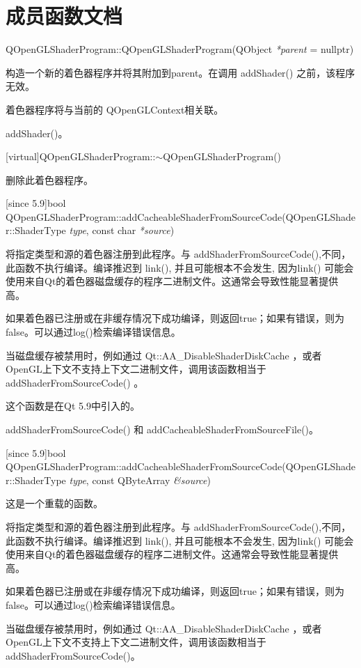 \section{成员函数文档}

QOpenGLShaderProgram::QOpenGLShaderProgram(QObject \emph{*parent} = nullptr)

构造一个新的着色器程序并将其附加到parent。在调用 addShader() 之前，该程序无效。

着色器程序将与当前的 QOpenGLContext相关联。

\begin{seeAlso}
addShader()。
\end{seeAlso}

[virtual]QOpenGLShaderProgram::$\sim$QOpenGLShaderProgram()

删除此着色器程序。

[since 5.9]bool QOpenGLShaderProgram::addCacheableShaderFromSourceCode(QOpenGLShader::ShaderType \emph{type}, const char \emph{*source})

将指定类型和源的着色器注册到此程序。与 addShaderFromSourceCode(),不同，此函数不执行编译。编译推迟到 link(), 并且可能根本不会发生, 因为link() 可能会使用来自Qt的着色器磁盘缓存的程序二进制文件。这通常会导致性能显著提供高。

如果着色器已注册或在非缓存情况下成功编译，则返回true；如果有错误，则为false。可以通过log()检索编译错误信息。

当磁盘缓存被禁用时，例如通过 Qt::AA\_DisableShaderDiskCache ，或者OpenGL上下文不支持上下文二进制文件，调用该函数相当于addShaderFromSourceCode() 。

这个函数是在Qt 5.9中引入的。

\begin{seeAlso}
addShaderFromSourceCode() 和 addCacheableShaderFromSourceFile()。
\end{seeAlso}

[since 5.9]bool QOpenGLShaderProgram::addCacheableShaderFromSourceCode(QOpenGLShader::ShaderType \emph{type}, const QByteArray \emph{\&source})

这是一个重载的函数。

将指定类型和源的着色器注册到此程序。与 addShaderFromSourceCode(),不同，此函数不执行编译。编译推迟到 link(), 并且可能根本不会发生, 因为link() 可能会使用来自Qt的着色器磁盘缓存的程序二进制文件。这通常会导致性能显著提供高。

如果着色器已注册或在非缓存情况下成功编译，则返回true；如果有错误，则为false。可以通过log()检索编译错误信息。

当磁盘缓存被禁用时，例如通过 Qt::AA\_DisableShaderDiskCache ，或者OpenGL上下文不支持上下文二进制文件，调用该函数相当于addShaderFromSourceCode()。

